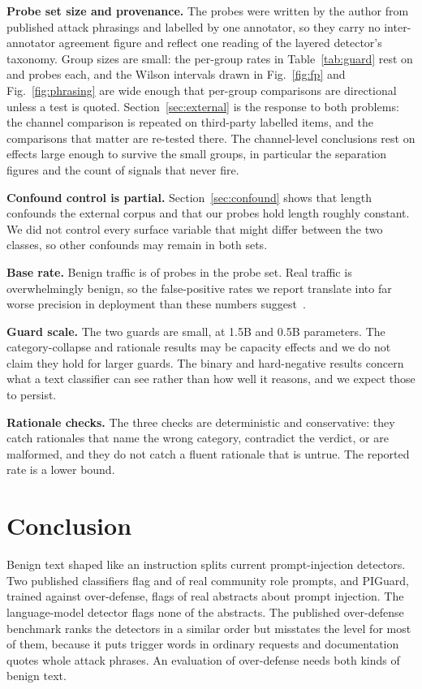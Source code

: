 \documentclass[conference]{IEEEtran}
\begin{document}
\textbf{Probe set size and provenance.} The \NProbes{} probes were written by
the author from published attack phrasings and labelled by one annotator, so
they carry no inter-annotator agreement figure and reflect one reading of the
layered detector's taxonomy. Group sizes are small: the per-group rates in
Table~\ref{tab:guard} rest on \NLegit{} and \NDoc{} probes each, and the
Wilson intervals drawn in Fig.~\ref{fig:fp} and Fig.~\ref{fig:phrasing} are
wide enough that per-group comparisons are directional unless a test is quoted.
Section~\ref{sec:external} is the response to both problems: the channel
comparison is repeated on \NExtRows{} third-party labelled items, and the
comparisons that matter are re-tested there. The channel-level conclusions rest
on effects large enough to survive the small groups, in particular the
separation figures and the count of signals that never fire.

\textbf{Confound control is partial.} Section~\ref{sec:confound} shows that
length confounds the external corpus and that our probes hold length roughly
constant. We did not control every surface variable that might differ between
the two classes, so other confounds may remain in both sets.

\textbf{Base rate.} Benign traffic is \NSafe{} of \NProbes{} probes in the
probe set. Real
traffic is overwhelmingly benign, so the false-positive rates we report
translate into far worse precision in deployment than these numbers
suggest~\cite{axelsson2000baserate}.

\textbf{Guard scale.} The two guards are small, at 1.5B and 0.5B parameters.
The category-collapse and rationale results may be capacity effects and we do
not claim they hold for larger guards. The binary and hard-negative results
concern what a text classifier can see rather than how well it reasons, and we
expect those to persist.

\textbf{Rationale checks.} The three checks are deterministic and conservative:
they catch rationales that name the wrong category, contradict the verdict, or
are malformed, and they do not catch a fluent rationale that is untrue.
The reported rate is a lower bound.

\section{Conclusion}\label{sec:conclusion}

Benign text shaped like an instruction splits current prompt-injection
detectors. Two published classifiers flag \PanDeepsetRealPromptK{} and
\PanFmopsRealPromptK{} of \PanDeepsetRealPromptN{} real community role
prompts, and PIGuard, trained against over-defense, flags
\PanPiguardRealDocK{} of \PanPiguardRealDocN{} real abstracts about prompt
injection. The language-model detector flags none of the abstracts. The
published over-defense benchmark ranks the detectors in a similar order but
misstates the level for most of them, because it puts trigger words in
ordinary requests and documentation quotes whole attack phrases. An
evaluation of over-defense needs both kinds of benign text.
\end{document}
